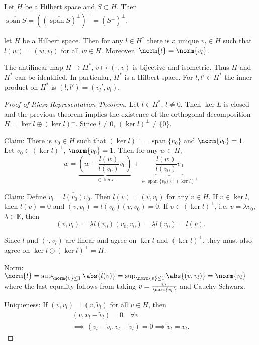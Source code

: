 \documentclass{article}
\newcommand{\K}{\mathbb{K}}
\DeclareMathOperator{\spn}{span}
\begin{document}
\begin{cor}
    Let $H$ be a Hilbert space and $S \subset H$.
    Then $\overline{\spn S} = ((\overline{\spn S})^\perp)^\perp  = (S^\perp)^\perp$.
\end{cor}

\begin{thm}
    let $H$ be a Hilbert space.
    Then for any $l \in H^*$ there is a unique $v_l \in H$ such that $l(w) = (w, v_l)$ for all $w \in H$.
    Moreover, $\norm{l} = \norm{v_l}$.
\end{thm}

\begin{cor}
    The antilinear map $H \to H^*$, $v \mapsto (\cdot, v)$ is bijective and isometric.
    Thus $H$ and $H^*$ can be identified.
    In particular, $H^*$ is a Hilbert space.
    For $l, l' \in H^*$ the inner product on $H^*$ is $(l, l') = (v_l', v_l)$.
\end{cor}

\begin{proof}[Proof of Riesz Representation Theorem]
    Let $l \in H^*$, $l \neq 0$. Then $\ker L$ is closed and the previous theorem implies the existence of the orthogonal decomposition $H = \ker l \oplus (\ker l)^\perp$.
    Since $l \neq 0$, $(\ker l)^\perp \neq \{0\}$.

    Claim: There is $v_0 \in H$ such that $(\ker l)^\perp = \spn \{v_0\}$ and $\norm{v_0} = 1$.
    Let $v_0 \in (\ker l)^\perp$, $\norm{v_0} = 1$. Then for any $w \in H$,
    \begin{equation*}
        w = \underbrace{\left(w - \frac{l(w)}{l(v_0)} v_0\right)}_{\in \ker l} + \underbrace{\frac{l(w)}{l(v_0)} v_0}_{\in \spn \{v_0\} \subset (\ker l)^\perp}
    \end{equation*}

    Claim: Define $v_l = \overline{l(v_0)} v_0$.
    Then $l(v) = (v, v_l)$ for any $v \in H$.
    If $v \in \ker l$, then $l(v) = 0$ and $(v, v_l) = l(v_0) (v,v_0) = 0$.
    If $v \in (\ker l)^\perp$, i.e. $v = \lambda v_0$, $\lambda \in \K$, then
    \begin{equation*}
        (v, v_l) = \lambda l(v_0) (v_0, v_0) = \lambda l(v_0) = l(v).
    \end{equation*}

    Since $l$ and $(\cdot, v_l)$ are linear and agree on $\ker l$ and $(\ker l)^\perp$, they must also agree on $\ker l \oplus (\ker l)^\perp = H$.

    Norm: $\norm{l} = \sup_{\norm{v} \leq 1} \abs{l(v)} = \sup_{\norm{v} \leq 1} \abs{(v, v_l)} = \norm{v_l}$
    where the last equality follows from taking $v = \frac{v_l}{\norm{v_l}}$ and Cauchy-Schwarz.

    Uniqueness: If $(v, v_l) = (v, \tilde{v}_l)$ for all $v \in H$, then
    \begin{align*}
        (v, v_l - \tilde{v}_l) = 0 \quad \forall v \\
        \implies (v_l - \tilde{v}_l, v_l - \tilde{v}_l) = 0 \implies \tilde{v}_l = v_l.
    \end{align*}
\end{proof}
\end{document}
